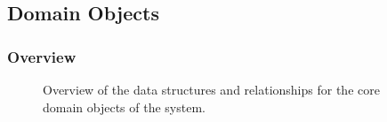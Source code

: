 \documentclass[12pt]{article}
\begin{document}
\vspace{0.2in}



\subsection{Domain Objects}
\subsubsection{Overview}

\begin{figure}[H]
\centering	
{}
\caption{Overview of the data structures and relationships for the core domain objects of the
system.}
\end{figure}
\end{document}
